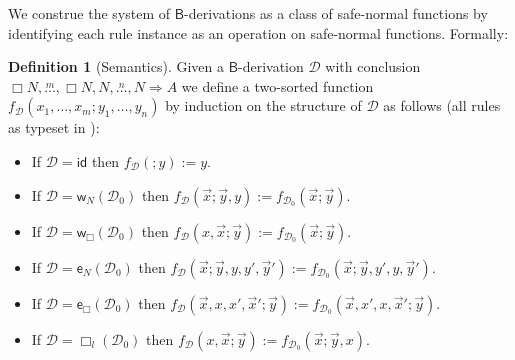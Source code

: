 \documentclass[manuscript,screen]{acmart}
\newcommand{\dfn}{:=}
\newcommand{\anupam}[1]{\todo{A: #1}}
\theoremstyle{definition}
\newtheorem{defn}[thm]{Definition}
\theoremstyle{remark}
\newcommand{\n}{N}
\newcommand{\sq}{\Box}
\newcommand{\sqn}{{\sq\n}}
\newcommand{\sn}{\sqn}
\newcommand{\lists}[3]{{#2},\overset{#1}{\ldots},{#3} }
\newcommand{\denot}[1]{f_{#1}}
\newcommand{\bc}{\mathsf{B}}
\newcommand{\seqar}{\Rightarrow}
\newcommand{\der}{\mathcal{D}}
\newcommand{\id}{\mathsf{id}}
\newcommand{\wk}{\mathsf{w}}
\newcommand{\exch}{\mathsf{e}}
\newcommand{\boxlef}{\sq_l}
\newcommand{\boxrig}{\sq_r}
\newcommand{\sql}{\boxlef}
\newcommand{\sqr}{\boxrig}
\begin{document}
We construe the system of $\bc$-derivations as a class of safe-normal functions by identifying each rule instance as an operation on safe-normal functions.
Formally:

\begin{defn}
[Semantics]
\label{defn:semantics-bc}
Given a $\bc$-derivation $\der$ with conclusion  $\lists{m}{\sn}{\sn}, \lists{n}{\n}{\n} \seqar A$ 
we define a two-sorted function $\denot \der (x_1, \dots, x_m;y_1, \dots, y_n)$ by induction on the structure of $\der$ as follows (all rules as typeset in ):
\begin{itemize}
    \item If $\der = \id$ then $\denot{\der} (;y) \dfn y $.
    \item If $\der =\wk_\n(\der_0)$ then  $\denot {\der} (\vec x; \vec y, y) \dfn \denot{\der_0} (\vec x;\vec y)$.
    \item If $\der=\wk_\sq(\der_0)$ then $\denot {\der} (x, \vec x; \vec y) \dfn \denot{\der_0} (\vec x;\vec y)$.
    \item If $\der=\exch_\n(\der_0)$ then $\denot {\der} (\vec x; \vec y, y,y', \vec y') \dfn \denot{\der_0} (\vec x; \vec y, y',y, \vec y')$.
    \item If $\der=\exch_\sq(\der_0)$ then $\denot {\der} (\vec x, x, x', \vec x'; \vec y) \dfn \denot{\der_0} (\vec x, x',x , \vec x'; \vec y)$.
    \item If $\der=\sql(\der_0)$ then $\denot { \der} (x, \vec x; \vec y) \dfn \denot{\der_0}(\vec x; \vec y, x)$.

\end{itemize}
\end{defn}
\end{document}
